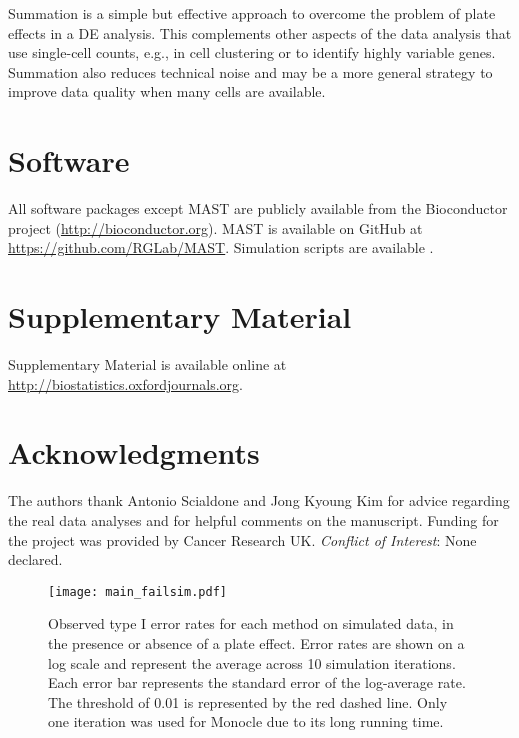 \documentclass[oupdraft]{bio}
\begin{document}
Summation is a simple but effective approach to overcome the problem of plate effects in a DE analysis. 
This complements other aspects of the data analysis that use single-cell counts, e.g., in cell clustering or to identify highly variable genes.
Summation also reduces technical noise and may be a more general strategy to improve data quality when many cells are available.

\section{Software}
\label{sec5}
All software packages except MAST are publicly available from the Bioconductor project (\url{http://bioconductor.org}).
MAST is available on GitHub at \url{https://github.com/RGLab/MAST}.
Simulation scripts are available .

\section{Supplementary Material}
Supplementary Material is available online at \href{http://biostatistics.oxfordjournals.org}{http://biostatistics.oxfordjournals.org}.

\section*{Acknowledgments}
The authors thank Antonio Scialdone and Jong Kyoung Kim for advice regarding the real data analyses and for helpful comments on the manuscript.
Funding for the project was provided by Cancer Research UK.
{\it Conflict of Interest}: None declared.




\begin{figure}[!p]
\begin{center}
\texttt{[image: main\_failsim.pdf]}
\end{center}
\caption{
    Observed type I error rates for each method on simulated data, in the presence or absence of a plate effect.
    Error rates are shown on a log scale and represent the average across 10 simulation iterations.
    Each error bar represents the standard error of the log-average rate.
    The threshold of 0.01 is represented by the red dashed line.
    Only one iteration was used for Monocle due to its long running time.
}
\label{fig:platefail}
\end{figure}
\end{document}
